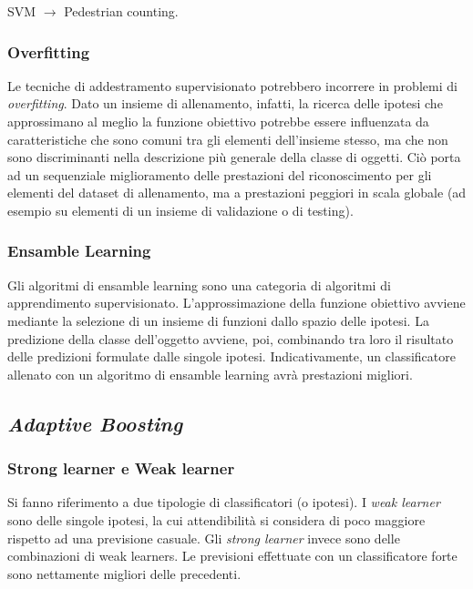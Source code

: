                 SVM $\rightarrow$ Pedestrian counting.

            \subsubsection{Overfitting}
                Le tecniche di addestramento supervisionato potrebbero incorrere in problemi di \emph{overfitting}.
                Dato un insieme di allenamento, infatti, la ricerca delle ipotesi che approssimano al meglio la funzione obiettivo potrebbe essere influenzata da caratteristiche che sono comuni tra gli elementi dell'insieme stesso, ma che non sono discriminanti nella descrizione più generale della classe di oggetti.
                Ciò porta ad un sequenziale miglioramento delle prestazioni del riconoscimento per gli elementi del dataset di allenamento, ma a prestazioni peggiori in scala globale (ad esempio su elementi di un insieme di validazione o di testing).

            \subsubsection{Ensamble Learning}
                Gli algoritmi di ensamble learning sono una categoria di algoritmi di apprendimento supervisionato.
                L'approssimazione della funzione obiettivo avviene mediante la selezione di un insieme di funzioni dallo spazio delle ipotesi.
                La predizione della classe dell'oggetto avviene, poi, combinando tra loro il risultato delle predizioni formulate dalle singole ipotesi.
                Indicativamente, un classificatore allenato con un algoritmo di ensamble learning avrà prestazioni migliori.

        \subsection{\emph{Adaptive Boosting}}
        \label{sub:adaptive_boosting}
            \subsubsection{Strong learner e Weak learner}
                Si fanno riferimento a due tipologie di classificatori (o ipotesi).
                I \emph{weak learner} sono delle singole ipotesi, la cui attendibilità si considera di poco maggiore rispetto ad una previsione casuale.
                Gli \emph{strong learner} invece sono delle combinazioni di weak learners. Le previsioni effettuate con un classificatore forte sono nettamente migliori delle precedenti.

